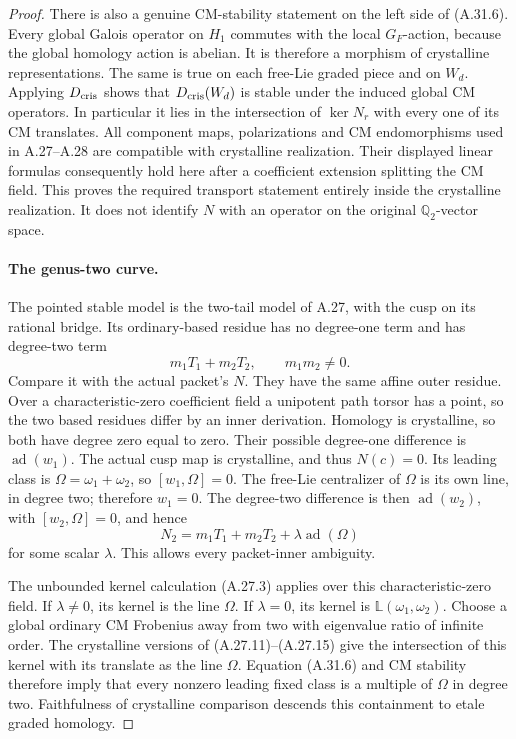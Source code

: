 \begin{proof}
There is also a genuine CM-stability statement on
the left side of (A.31.6). Every global Galois operator
on \(H_1\) commutes with the local \(G_F\)-action,
because the global homology action is abelian.
It is therefore a morphism of crystalline
representations. The same is true on each free-Lie
graded piece and on \(W_d\). Applying \(D_{\rm cris}\)
shows that \(D_{\rm cris}(W_d)\) is stable under the
induced global CM operators. In particular it lies
in the intersection of \(\ker N_r\) with every one
of its CM translates.
All component maps, polarizations and CM
endomorphisms used in A.27--A.28 are compatible
with crystalline realization. Their displayed
linear formulas consequently hold here after a
coefficient extension splitting the CM field.
This proves the required transport statement
entirely inside the crystalline realization.
It does not identify \(N\) with an operator on
the original \(\mathbb Q_2\)-vector space.

\paragraph{The genus-two curve.}
The pointed stable model is the two-tail model of
A.27, with the cusp on its rational bridge.
Its ordinary-based residue has no degree-one term
and has degree-two term
\[
                           m_1T_1+m_2T_2,
                     \qquad m_1m_2\ne0.                \tag{A.31.7}
\]
Compare it with the actual packet's \(N\).
They have the same affine outer residue. Over a
characteristic-zero coefficient field a unipotent
path torsor has a point, so the two based residues
differ by an inner derivation. Homology is
crystalline, so both have degree zero equal to
zero. Their possible degree-one difference is
\(\operatorname{ad}(w_1)\).
The actual cusp map is crystalline, and thus
\(N(c)=0\). Its leading class is
\(\Omega=\omega_1+\omega_2\), so
\([w_1,\Omega]=0\). The free-Lie centralizer of
\(\Omega\) is its own line, in degree two;
therefore \(w_1=0\).
The degree-two difference is then
\(\operatorname{ad}(w_2)\), with
\([w_2,\Omega]=0\), and hence
\[
                  N_2=m_1T_1+m_2T_2
                                +\lambda\operatorname{ad}(\Omega)
                                                        \tag{A.31.8}
\]
for some scalar \(\lambda\). This allows every
packet-inner ambiguity.

The unbounded kernel calculation (A.27.3) applies
over this characteristic-zero field. If
\(\lambda\ne0\), its kernel is the line \(\Omega\).
If \(\lambda=0\), its kernel is
\(\mathbb L(\omega_1,\omega_2)\).
Choose a global ordinary CM Frobenius away from
two with eigenvalue ratio of infinite order.
The crystalline versions of (A.27.11)--(A.27.15)
give the intersection of this kernel with its
translate as the line \(\Omega\).
Equation (A.31.6) and CM stability therefore imply
that every nonzero leading fixed class is a
multiple of \(\Omega\) in degree two.
Faithfulness of crystalline comparison descends
this containment to etale graded homology.


\end{proof}
